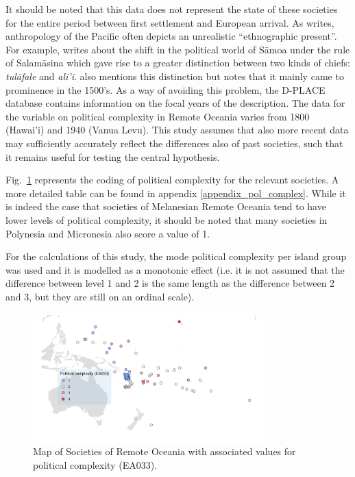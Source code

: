 \documentclass[unnumsec,webpdf,modern,medium]{oup-authoring-template}
\begin{document}


It should be noted that this data does not represent the state of these societies for the entire period between first settlement and European arrival. As \citet{meleisea1995} writes, anthropology of the Pacific often depicts an unrealistic ``ethnographic present''. For example, \citet[185]{schoeffel87} writes about the shift in the political world of S\={a}moa under the rule of Salam\={a}sina which gave rise to a greater distinction between two kinds of chiefs: \emph{tul\={a}fale} and \emph{ali'i}. \citet[249]{kirch2017road} also mentions this distinction but notes that it mainly came to prominence in the 1500's. As a way of avoiding this problem, the D-PLACE database \citep{d_place_all} contains information on the focal years of the description. The data for the variable on political complexity in Remote Oceania varies from 1800 (Hawai'i) and 1940 (Vanua Levu). This study assumes that also more recent data may sufficiently accurately reflect the differences also of past societies, such that it remains useful for testing the central hypothesis.

Fig.~\ref{appendix_pol_complex_map} represents the coding of political complexity for the relevant societies. A more detailed table can be found in appendix \ref{appendix_pol_complex}. While it is indeed the case that societies of Melanesian Remote Oceania tend to have lower levels of political complexity, it should be noted that many societies in Polynesia and Micronesia also score a value of 1.

For the calculations of this study, the mode political complexity per island group was used and it is modelled as a monotonic effect (i.e. it is not assumed that the difference between level 1 and 2 is the same length as the difference between 2 and 3, but they are still on an ordinal scale).

\begin{figure}
\centering
\includegraphics[width=0.8\textwidth]{map_pol_complex.png}
\caption[Map of Remote Oceania: Political complexity]{{Map of Societies of Remote Oceania with associated values for political complexity (EA033).}}
\label{appendix_pol_complex_map}
\end{figure}
\end{document}
